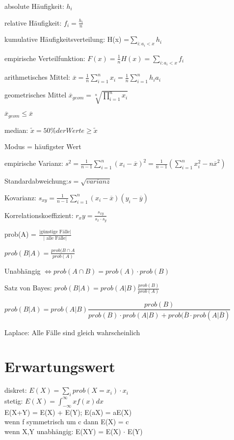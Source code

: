 absolute Häufigkeit: $h_i$

relative Häufigkeit: $f_i= \frac{h_i}{n}$

kumulative Häufigkeitsverteilung: H(x) =$\sum_{i:a_i < x} h_i$

empirische Verteilfunktion: $F(x) =  \frac{1}{n} H(x) = \sum_{i:a_i < x} f_i$

arithmetisches Mittel: $\overline{x} = \frac{1}{n} \sum_{i=1}^n x_i = \frac{1}{n} \sum_{i=1}^n h_i a_i $

geometrisches Mittel $\overline{x}_{geom} = \sqrt[n]{\prod_{i=1}^n x_i}$

$\overline{x}_{geom} \leq \overline{x}$

median:  $\tilde{x} = 50\% der Werte \geq \tilde{x} $


Modus = häufigster Wert

empirische Varianz: $s^2 = \frac{1}{n-1}\sum_{i=1}^n(x_i-\overline{x})^2 = \frac{1}{n-1}\left(\sum_{i=1}^n x_i^2-n\overline{x}^2\right)$

Standardabweichung:$s = \sqrt{varianz} $

Kovarianz: $s_{xy} = \frac{1}{n-1}\sum_{i=1}^n(x_i-\overline{x})(y_i-\overline{y})$

Korrelationskoeffizient: $r_xy = \frac{s_{xy}}{s_x\cdot s_y}$

prob(A) = $\frac{\text{|günstige Fälle|}}{\text{| alle Fälle|}}$

$prob(B|A) = \frac{prob(B \cap A}{prob(A)}$

Unabhängig $\Leftrightarrow prob(A \cap B)=prob(A)\cdot prob(B)$

Satz von Bayes: $prob(B|A) = prob(A|B)\frac{prob(B)}{prob(A)}$

$prob(B|A) = prob(A|B)\dfrac{prob(B)}{prob(B)\cdot prob(A|B) + prob(\overline{B} \cdot prob(A|\overline{B}) }$

Laplace: Alle Fälle sind gleich wahrscheinlich


\section*{Erwartungswert}
diskret: $ E(X) = \sum_i prob(X=x_i)\cdot x_i$\\
stetig: $E(X) = \int_{-\infty}^{\infty}xf(x)dx$\\

E(X+Y) = E(X) + E(Y); E(aX) = aE(X) \\
wenn f symmetrisch um c dann E(X) = c\\
wenn X,Y unabhängig: E(XY) = E(X) $\cdot$ E(Y)

